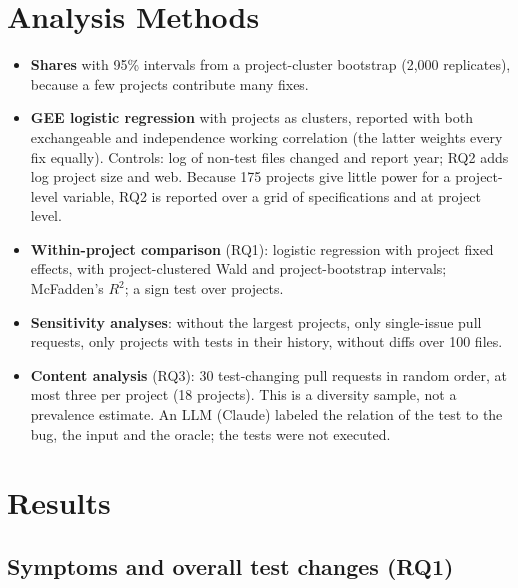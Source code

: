 \documentclass[10pt,twocolumn,a4paper]{article}
\begin{document}
\section{Analysis Methods}\label{sec:methods}

\begin{itemize}
\item \textbf{Shares} with 95\% intervals from a project-cluster bootstrap (2,000 replicates), because a few projects contribute many fixes.
\item \textbf{GEE logistic regression} with projects as clusters, reported with both exchangeable and independence working correlation (the latter weights every fix equally). Controls: log of non-test files changed and report year; RQ2 adds log project size and web. Because 175 projects give little power for a project-level variable, RQ2 is reported over a grid of specifications and at project level.
\item \textbf{Within-project comparison} (RQ1): logistic regression with project fixed effects, with project-clustered Wald and project-bootstrap intervals; McFadden's $R^2$; a sign test over projects.
\item \textbf{Sensitivity analyses}: without the largest projects, only single-issue pull requests, only projects with tests in their history, without diffs over 100 files.
\item \textbf{Content analysis} (RQ3): 30 test-changing pull requests in random order, at most three per project (18 projects). This is a diversity sample, not a prevalence estimate. An LLM (Claude) labeled the relation of the test to the bug, the input and the oracle; the tests were not executed.
\end{itemize}

\section{Results}\label{sec:results}

\subsection{Symptoms and overall test changes (RQ1)}
\end{document}
